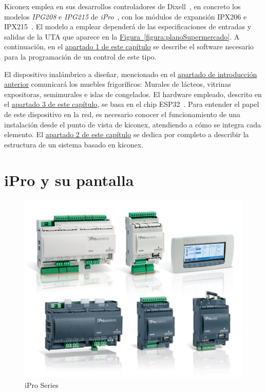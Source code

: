 Kiconex emplea en sus desarrollos controladores de Dixell~\cite{marcaDixell}, en concreto los modelos \textit{IPG208} e \textit{IPG215} de \textit{iPro}~\cite{iproManual}, con los módulos de expansión IPX206 e IPX215~\cite{iproManual}. El modelo a emplear dependerá de las especificaciones de entradas y salidas de la UTA que aparece en la \hyperref[figura:planoSupermercado]{Figura~\ref{figura:planoSupermercado}}. A continuación, en el \hyperref[sec:kiconex]{apartado 1 de este capítulo} se describe el software necesario para la programación de un control de este tipo.

El dispositivo inalámbrico a diseñar, mencionado en el \hyperref[chap:intro]{apartado de introducción anterior} comunicará los muebles frigoríficos: Murales de lácteos, vitrinas expositoras, semimurales e islas de congelados. El hardware empleado, descrito en el \hyperref[sec:esp32poe]{apartado 3 de este capítulo}, se basa en el chip ESP32~\cite{esp32Espressif}. Para entender el papel de este dispositivo en la red, es necesario conocer el funcionamiento de una instalación desde el punto de vista de kiconex, atendiendo a cómo se integra cada elemento. El \hyperref[sec:kiconex]{apartado 2 de este capítulo} se dedica por completo a describir la estructura de un sistema basado en kiconex.


\break
\section{iPro y su pantalla}
\label{sec:iproypantalla}

\begin{figure}[h]
  \centering
  \includegraphics[width=12cm, keepaspectratio]{img/iproSeries}
  \caption{iPro Series}
  \label{figura:iproSeries}
\end{figure}

